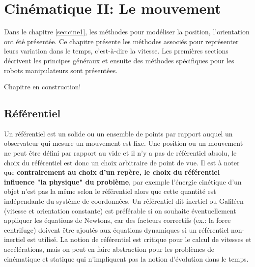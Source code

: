 \chapter{Cinématique II: Le mouvement}
\label{sec:cinediff}



Dans le chapitre \ref{sec:cine1}, les méthodes pour modéliser la position, l'orientation ont été présentée. Ce chapitre présente les méthodes associés pour représenter leurs variation dans le temps, c'est-à-dire la vitesse. Les premières sections décrivent les principes généraux et ensuite des méthodes spécifiques pour les robots manipulateurs sont présentées. 

Chapitre en construction!


\newpage
\section{Référentiel} 

Un référentiel est un solide ou un ensemble de points par rapport auquel un observateur qui mesure un mouvement est fixe. Une position ou un mouvement ne peut être défini par rapport au vide et il n'y a pas de référentiel absolu, le choix du référentiel est donc un choix arbitraire de point de vue. Il est à noter que \textbf{contrairement au choix d'un repère, le choix du référentiel influence "la physique" du problème}, par exemple l'énergie cinétique d'un objet n'est pas la même selon le référentiel alors que cette quantité est indépendante du système de coordonnées. Un référentiel dit inertiel ou Galiléen (vitesse et orientation constante) est préférable si on souhaite éventuellement appliquer les équations de Newtons, car des facteurs correctifs (ex.: la force centrifuge) doivent être ajoutés aux équations dynamiques si un référentiel non-inertiel est utilisé. La notion de référentiel est critique pour le calcul de vitesses et accélérations, mais on peut en faire abstraction pour les problèmes de cinématique et statique qui n'impliquent pas la notion d'évolution dans le temps. 


